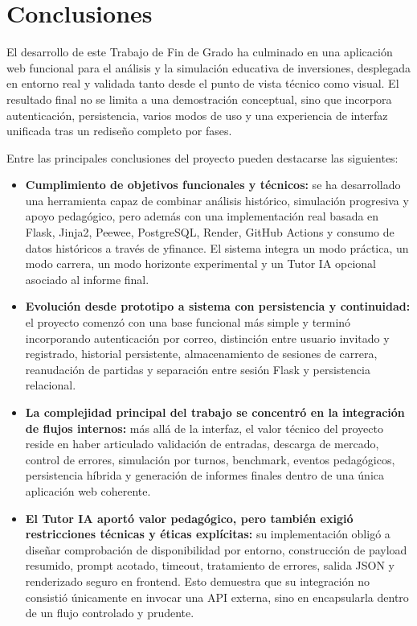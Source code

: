 \section{Conclusiones}

El desarrollo de este Trabajo de Fin de Grado ha culminado en una aplicación web funcional para el análisis y la simulación educativa de inversiones, desplegada en entorno real y validada tanto desde el punto de vista técnico como visual. El resultado final no se limita a una demostración conceptual, sino que incorpora autenticación, persistencia, varios modos de uso y una experiencia de interfaz unificada tras un rediseño completo por fases.

Entre las principales conclusiones del proyecto pueden destacarse las siguientes:

\begin{itemize}
    \item \textbf{Cumplimiento de objetivos funcionales y técnicos:} se ha desarrollado una herramienta capaz de combinar análisis histórico, simulación progresiva y apoyo pedagógico, pero además con una implementación real basada en Flask, Jinja2, Peewee, PostgreSQL, Render, GitHub Actions y consumo de datos históricos a través de yfinance. El sistema integra un modo práctica, un modo carrera, un modo horizonte experimental y un Tutor IA opcional asociado al informe final.

    \item \textbf{Evolución desde prototipo a sistema con persistencia y continuidad:} el proyecto comenzó con una base funcional más simple y terminó incorporando autenticación por correo, distinción entre usuario invitado y registrado, historial persistente, almacenamiento de sesiones de carrera, reanudación de partidas y separación entre sesión Flask y persistencia relacional.

    \item \textbf{La complejidad principal del trabajo se concentró en la integración de flujos internos:} más allá de la interfaz, el valor técnico del proyecto reside en haber articulado validación de entradas, descarga de mercado, control de errores, simulación por turnos, benchmark, eventos pedagógicos, persistencia híbrida y generación de informes finales dentro de una única aplicación web coherente.

    \item \textbf{El Tutor IA aportó valor pedagógico, pero también exigió restricciones técnicas y éticas explícitas:} su implementación obligó a diseñar comprobación de disponibilidad por entorno, construcción de payload resumido, prompt acotado, timeout, tratamiento de errores, salida JSON y renderizado seguro en frontend. Esto demuestra que su integración no consistió únicamente en invocar una API externa, sino en encapsularla dentro de un flujo controlado y prudente.


\end{itemize}
